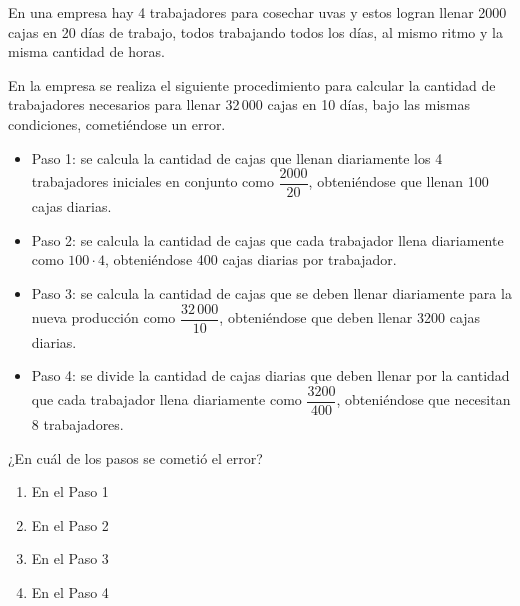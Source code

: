 \begin{problem}
    En una empresa hay 4 trabajadores para cosechar uvas y estos logran llenar 2000 cajas en 20 días de trabajo, todos trabajando todos los días, al mismo ritmo y la misma cantidad de horas.

    En la empresa se realiza el siguiente procedimiento para calcular la cantidad de trabajadores necesarios para llenar 32\,000 cajas en 10 días, bajo las mismas condiciones, cometiéndose un error.

    \begin{itemize}
        \item Paso 1: se calcula la cantidad de cajas que llenan diariamente los 4 trabajadores iniciales en conjunto como $\dfrac{2000}{20}$, obteniéndose que llenan 100 cajas diarias.
        \item Paso 2: se calcula la cantidad de cajas que cada trabajador llena diariamente como $100 \cdot 4$, obteniéndose 400 cajas diarias por trabajador.
        \item Paso 3: se calcula la cantidad de cajas que se deben llenar diariamente para la nueva producción como $\dfrac{32\,000}{10}$, obteniéndose que deben llenar 3200 cajas diarias.
        \item Paso 4: se divide la cantidad de cajas diarias que deben llenar por la cantidad que cada trabajador llena diariamente como $\dfrac{3200}{400}$, obteniéndose que necesitan 8 trabajadores.
    \end{itemize}

    ¿En cuál de los pasos se cometió el error?

    \begin{enumerate}[label=\Alph*.]
        \item En el Paso 1
        \item En el Paso 2
        \item En el Paso 3
        \item En el Paso 4
    \end{enumerate}
\end{problem}
